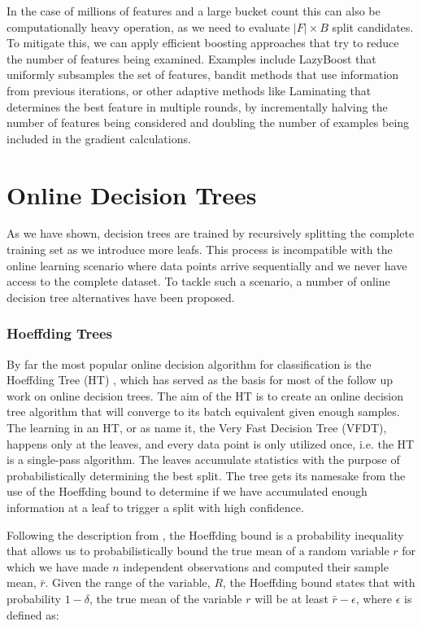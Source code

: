 In the case of millions of features and a large bucket count this can also be
computationally heavy operation, as we need to evaluate $|F| \times B$ split candidates.
To mitigate this, we can apply efficient boosting approaches that try
to reduce the number of features being examined. Examples include LazyBoost \cite{lazyboost}
that uniformly subsamples the set of features,
bandit methods \cite{bandits-boosting} that use information from previous iterations, or other adaptive
methods like Laminating \cite{laminating} that determines the best feature in multiple rounds, by incrementally
halving the number of features being considered and doubling the number of examples being
included in the gradient calculations.

\section{Online Decision Trees}
\label{sec:bg-dt-online-trees}

As we have shown, decision trees are trained by recursively splitting the complete
training set as we introduce more leafs. This process is incompatible with the online
learning scenario where data points arrive sequentially and we never have access to
the complete dataset. To tackle such a scenario, a number of online decision tree
alternatives have been proposed.

\subsubsection*{Hoeffding Trees}

By far the most popular online decision algorithm for classification is the Hoeffding Tree (HT) \cite{vfdt},
which has served as the basis for most of the follow up work on online decision
trees. The aim of the HT is to create an online decision tree algorithm that will converge
to its batch equivalent given enough samples.
The learning in an HT, or as \citet{vfdt} name it, the Very Fast Decision
Tree (VFDT), happens only at the leaves, and every data point is only utilized
once, i.e. the HT is a single-pass algorithm. The leaves accumulate statistics
with the purpose of probabilistically determining the best split. The tree gets its
namesake from the use of the Hoeffding bound to determine if we have accumulated
enough information at a leaf to trigger a split with high confidence.

Following the description from \citet{vfdt}, the Hoeffding bound \cite{hoeffding-bound} is a probability inequality that allows
us to probabilistically bound the true mean of a random variable $r$ for which we have
made $n$ independent observations and computed their sample mean, $\bar{r}$. Given
the range of the variable, $R$, the Hoeffding bound states that with probability
$1-\delta$, the true mean of the variable $r$ will be at least $\bar{r}-\epsilon$, where
$\epsilon$ is defined as:

